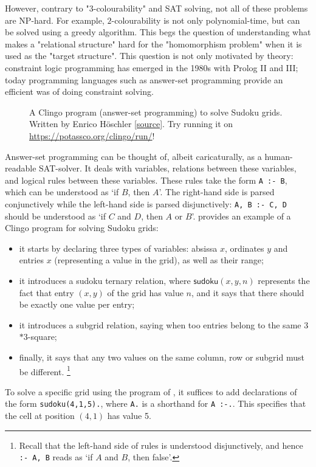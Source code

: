 However, contrary to "$3$-colourability" and SAT solving, not all of these problems are NP-hard. For example, $2$-colourability is not only polynomial-time,
but can be solved using a greedy algorithm. This begs the question of understanding what
makes a "relational structure" hard for the "homomorphism problem" when it is used
as the "target structure".
This question is not only motivated by theory: constraint logic programming has emerged in the 1980s
with Prolog II and III; today programming languages such as answer-set programming provide an 
efficient was of doing constraint solving.

\begin{figure}
	\centering
	
	\caption{
		\AP\label{fig:ex-sudoku-asp}
		A Clingo program (answer-set programming) to solve Sudoku grids.
		Written by Enrico Höschler
		\href{https://ddmler.github.io/asp/2018/07/10/answer-set-programming-sudoku-solver.html}{[source]}.
		Try running it on \url{https://potassco.org/clingo/run/}!
	}
\end{figure}

Answer-set programming can be thought of, albeit caricaturally, as a human-readable
SAT-solver. It deals with variables, relations between these variables,
and logical rules between these variables. These rules take the form
\lstinline|A :- B|, which can be understood as `if $B$, then $A$'.
The right-hand side is parsed conjunctively while the left-hand side is parsed disjunctively:
\lstinline|A, B :- C, D| should be understood as `if $C$ and $D$, then $A$ or $B$'.
 provides
an example of a Clingo program for solving Sudoku grids:
\begin{itemize}
	\item it starts by declaring three types of variables: absissa $x$, ordinates $y$ and entries $x$ (representing a value in the grid), as well as their range;
	\item it introduces a \textsf{sudoku} ternary relation, where $\textsf{sudoku}(x,y,n)$
		represents the fact that entry $(x,y)$ of the grid has value $n$,
		and it says that there should be exactly one value per entry;
	\item it introduces a \textsf{subgrid} relation, saying when too entries
		belong to the same 3$\ast$3-square;
	\item finally, it says that any two values on the same column, row or subgrid
		must be different.%
		\footnote{Recall that the left-hand side of rules is understood disjunctively,
		and hence \lstinline|:- A, B| reads as `if $A$ and $B$, then false'.}
\end{itemize}
To solve a specific grid using the program of ,
it suffices to add declarations of the form \lstinline|sudoku(4,1,5).|,
where \lstinline|A.| is a shorthand for \lstinline|A :-.|.
This specifies that the cell at position $(4,1)$ has value 5.

